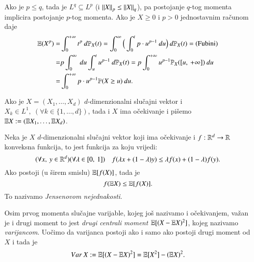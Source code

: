 Ako je $p \leq q$, tada je $L^q \subseteq L^p$ (i $\left\lVert {X} \right\rVert_p \leq \left\lVert {X} \right\rVert_q$), pa postojanje $q$-tog momenta implicira postojanje $p$-tog momenta.
Ako je $X \geq 0$ i $p > 0$ jednostavnim ra\v cunom daje
\begin{align}   \label{jed:5.12}
    \begin{split}
        \mathbb{E}({X^p}) =& \int_0^{+\infty} t^p \: d \mathbb{P}_X (t) = \int_0^{\infty} \Big( \int_0^t p \cdot u^{p - 1} \: d u \Big) \: d \mathbb{P}_X(t) = (\textnormal{Fubini})\\
        =& p \int_0^{\infty} \: du \int_u^t u ^{p-1} \: d \mathbb{P}_X (t) = p \int_0^{+\infty} u^{p-1} \mathbb{P}_X ([{u}, \:{+\infty}]) \: du \\
        =& \int_0^{+\infty} p \cdot u^{p-1} \mathbb{P}({X \geq u}) \: du.
    \end{split}
\end{align}

Ako je $X = (X_1, \ldots, X_d)$ $d$-dimenzionalni slu\v cajni vektor i $X_k \in L^1, \; (\forall k \in \{1, \ldots, d\})$, tada i $X$ ima o\v cekivanje i pi\v semo $\mathbb{E} X := (\mathbb{E} X_1, \ldots, \mathbb{E} X_d)$.

\begin{zad} \label{zad:5.13}
    Neka je $X$ $d$-dimenzionalni slu\v cajni vektor koji ima o\v cekivanje i $f: \mathbb{R}^d \to \mathbb{R}$ konveksna funkcija, to jest funkcija za koju vrijedi:
    \begin{equation*}
        (\forall x, \: y \in \mathbb{R}^d)(\forall \lambda \in [{0}, \:{1}]) \quad f (\lambda x + (1 - \lambda) y) \leq \lambda f(x) + (1 - \lambda) f(y).
    \end{equation*}
    Ako  postoji (u \v sirem smislu) $\mathbb{E} [ f(X) ]$, tada je
    \begin{equation*}
        f (\mathbb{E} X) \leq \mathbb{E} [ f(X) ].
    \end{equation*}
    To nazivamo \emph{Jensenovom nejednakosti}.
\end{zad}

Osim prvog momenta slu\v cajne varijable, kojeg jo\v s nazivamo i o\v cekivanjem, va\v zan je i drugi moment to jest \emph{drugi centrali moment} $\mathbb{E} [ (X - \mathbb{E} X)^2 ]$, kojeg nazivamo \emph{varijancom}.
Uo\v cimo da varijanca postoji ako i samo ako postoji drugi moment od $X$ i tada je
\begin{equation*}
    Var \: X := \mathbb{E} [ (X - \mathbb{E} X)^2 ] = \mathbb{E} [ X^2 ] - (\mathbb{E} X)^2.
\end{equation*}